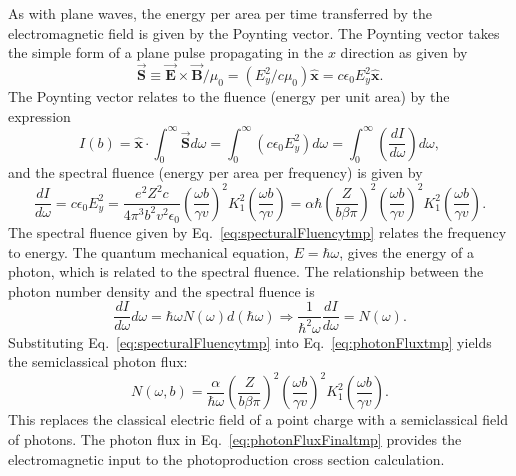     As with plane waves, the energy per area per time transferred by 
      the electromagnetic field is given by the Poynting vector.
    The Poynting vector takes the simple form of a plane pulse propagating in 
     the $x$ direction as given by
    \begin{equation} \label{eq:poyntingVectortmp}
        \vec{\mathbf{S}}\equiv
        \vec{\mathbf{E}}\times\vec{\mathbf{B}}/\mu_{0}=
        \left(E_{y}^{2}/c\mu_{0}\right)\mathbf{\hat{x}}=
        c\epsilon_{0}E_{y}^{2}\mathbf{\hat{x}}.
    \end{equation}
    The Poynting vector relates to the fluence (energy per unit area) 
      by the expression \cite{WWBrau} 
    \begin{equation} \label{eq:fluencytmp}
        I(b)=\mathbf{\hat{x}}\cdot\int^{\infty}_{0}\vec{\mathbf{S}}d\omega=
         \int^{\infty}_{0}\left(c\epsilon_{0}E_{y}^{2}\right)d\omega=
         \int^{\infty}_{0}\left(\frac{dI}{d\omega}\right)d\omega,
    \end{equation}
      and the spectral fluence (energy per area per frequency) is given 
      by
    \begin{equation} \label{eq:specturalFluencytmp}
      \frac{dI}{d\omega}=c\epsilon_{0}E_{y}^{2}=
       \frac{e^{2}Z^{2}c}{4\pi^{3}b^{2}v^{2}\epsilon_{0}}
       \left(\frac{\omega b}{\gamma v}\right)^{2}
         K_{1}^{2}\left(\frac{\omega b}{\gamma v}\right)=
        \alpha\hbar\left(\frac{Z}{b\beta\pi}\right)^{2}
         \left(\frac{\omega b}{\gamma v}\right)^{2}
       K_{1}^{2}\left(\frac{\omega b}{\gamma v}\right).
    \end{equation}
    The spectral fluence given by Eq.~\ref{eq:specturalFluencytmp} 
      relates the frequency to energy. 
    The quantum mechanical equation, $E=\hbar\omega$, gives the energy of a 
      photon, which is related to the spectral fluence. 
    The relationship between the photon number density and the spectral fluence
      is \cite{WWJackson}
    \begin{equation}  \label{eq:photonFluxtmp}
        \frac{dI}{d\omega}d\omega=\hbar\omega N(\omega)d(\hbar\omega)
        \Rightarrow \frac{1}{\hbar^{2}\omega}\frac{dI}{d\omega}=N(\omega).
    \end{equation}
    Substituting Eq.~\ref{eq:specturalFluencytmp} into 
      Eq.~\ref{eq:photonFluxtmp} yields the semiclassical photon flux:
    \begin{equation} \label{eq:photonFluxFinaltmp}
      N(\omega,b)=\frac{\alpha}{\hbar\omega}
       \left(\frac{Z}{b\beta\pi}\right)^{2}
       \left(\frac{\omega b}{\gamma v}\right)^{2}
       K_{1}^{2}\left(\frac{\omega b}{\gamma v}\right).
    \end{equation}
    This replaces the classical electric field of a point charge with a 
      semiclassical field of photons. 
    The photon flux in Eq.~\ref{eq:photonFluxFinaltmp} provides the 
      electromagnetic input to the \JPsi{} photoproduction cross section 
      calculation. 

